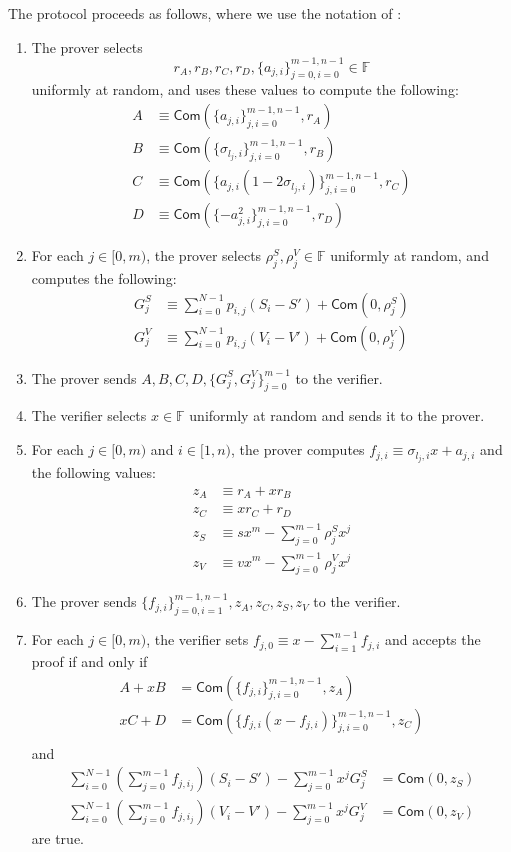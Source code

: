 \documentclass{llncs}
\newcommand{\F}{\mathbb{F}}
\newcommand{\func}[1]{\mathsf{#1}}
\newcommand{\com}{\func{Com}}
\begin{document}
The protocol proceeds as follows, where we use the notation of \cite{lelantus}:
\begin{enumerate}
    \item The prover selects $$r_A, r_B, r_C, r_D, \{a_{j,i}\}_{j=0,i=0}^{m-1,n-1} \in \F$$ uniformly at random, and uses these values to compute the following:
    \begin{align*}
        A &\equiv \com(\{a_{j,i}\}_{j,i=0}^{m-1,n-1}, r_A) \\
        B &\equiv \com(\{\sigma_{l_{j},i}\}_{j,i=0}^{m-1,n-1}, r_B) \\
        C &\equiv \com(\lbrace a_{j,i}(1-2\sigma_{l_j,i})\rbrace_{j,i=0}^{m-1,n-1}, r_C) \\
        D &\equiv \com(\{-a_{j,i}^2\}_{j,i=0}^{m-1,n-1}, r_D)
    \end{align*}
    \item For each $j \in [0,m)$, the prover selects $\rho^S_j, \rho^V_j \in \F$ uniformly at random, and computes the following:
    \begin{align*}
        G^S_j &\equiv \sum_{i=0}^{N-1}p_{i,j}(S_i - S') + \com(0, \rho^S_j) \\
        G^V_j &\equiv \sum_{i=0}^{N-1}p_{i,j}(V_i - V') + \com(0, \rho^V_j)
    \end{align*}
    \item The prover sends $A, B, C, D, \{G^S_j, G^V_j\}_{j=0}^{m-1}$ to the verifier.
    \item The verifier selects $x \in \F$ uniformly at random and sends it to the prover.
    \item For each $j \in [0,m)$ and $i \in [1,n)$, the prover computes $f_{j,i} \equiv \sigma_{l_{j},i}x + a_{j,i}$ and the following values:
    \begin{align*}
        z_A &\equiv r_A + xr_B \\
        z_C &\equiv xr_C + r_D \\
        z_S &\equiv sx^m -  \sum_{j=0}^{m-1}\rho^S_j x^j \\
        z_V &\equiv vx^m - \sum_{j=0}^{m-1}\rho^V_j x^j
    \end{align*}
    \item The prover sends $\{f_{j,i}\}_{j=0,i=1}^{m-1,n-1}, z_A, z_C, z_S, z_V$ to the verifier.
    \item For each $j \in [0,m)$, the verifier sets $f_{j,0} \equiv x - \sum_{i=1}^{n-1} f_{j,i}$ and accepts the proof if and only if
    \begin{align*}
        A + xB &= \com(\lbrace f_{j,i} \rbrace_{j,i=0}^{m-1,n-1}, z_A) \\
        xC + D &= \com(\lbrace f_{j,i}(x - f_{j,i})\rbrace_{j,i=0}^{m-1,n-1}, z_C) \\
    \end{align*}
    and
    \begin{align*}
        \sum_{i=0}^{N-1} \left(\sum_{j=0}^{m-1} f_{j,i_j}\right)(S_i - S') - \sum_{j=0}^{m-1} x^jG^S_j &= \com(0, z_S) \\
        \sum_{i=0}^{N-1} \left(\sum_{j=0}^{m-1} f_{j,i_j}\right)(V_i - V') - \sum_{j=0}^{m-1} x^jG^V_j &= \com(0, z_V)
    \end{align*}
    are true.
\end{enumerate}
\end{document}
